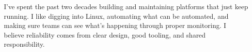 \par{
I’ve spent the past two decades building and maintaining platforms that just keep running.
I like digging into Linux, automating what can be automated, and making sure teams can see what’s happening through proper monitoring.
I believe reliability comes from clear design, good tooling, and shared responsibility.
}